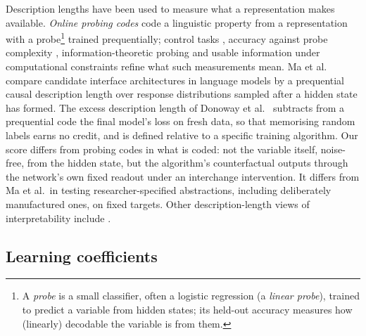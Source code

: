 \documentclass[11pt,a4paper]{article}
\begin{document}
Description lengths have been used to measure what a representation makes available. \emph{Online probing codes} \cite{voita2020} code a linguistic property from a representation with a probe\footnote{A \emph{probe} is a small classifier, often a logistic regression (a \emph{linear probe}), trained to predict a variable from hidden states; its held-out accuracy measures how (linearly) decodable the variable is from them.} trained prequentially; control tasks \cite{hewittliang2019}, accuracy against probe complexity \cite{pimentel2020pareto}, information-theoretic probing \cite{pimentel2020info} and usable information under computational constraints \cite{xu2020} refine what such measurements mean. Ma et al.\ \cite{ma2026} compare candidate interface architectures in language models by a prequential causal description length over response distributions sampled after a hidden state has formed. The excess description length of Donoway et al.\ \cite{donoway2026} subtracts from a prequential code the final model's loss on fresh data, so that memorising random labels earns no credit, and is defined relative to a specific training algorithm. Our score differs from probing codes in what is coded: not the variable itself, noise-free, from the hidden state, but the algorithm's counterfactual outputs through the network's own fixed readout under an interchange intervention. It differs from Ma et al.\ in testing researcher-specified abstractions, including deliberately manufactured ones, on fixed targets. Other description-length views of interpretability include \cite{gauderis2026,ayonrinde2024,gross2024,hilton2024}.

\subsection{Learning coefficients}
\label{sec:bg:slt}
\end{document}
